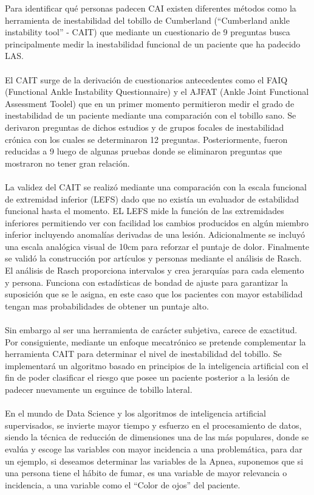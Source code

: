 Para identificar qué personas padecen CAI existen diferentes métodos como la herramienta de inestabilidad del tobillo de Cumberland (“Cumberland ankle instability tool” - CAIT) que mediante un cuestionario de 9 preguntas busca principalmente medir la inestabilidad funcional de un paciente que ha padecido LAS.
\\ \\
El CAIT surge de la derivación de cuestionarios antecedentes como el FAIQ (Functional Ankle Instability Questionnaire) y el AJFAT (Ankle Joint Functional Assessment Toolel) que en un primer momento permitieron medir el grado de inestabilidad de un paciente mediante una comparación con el tobillo sano. Se derivaron preguntas de dichos estudios y de grupos focales de inestabilidad crónica con los cuales se determinaron 12 preguntas. Posteriormente, fueron reducidas a 9 luego de algunas pruebas donde se eliminaron preguntas que mostraron no tener gran relación.
\\  \\
La validez del CAIT se realizó mediante una comparación con la escala funcional de extremidad inferior (LEFS) dado que no existía un evaluador de estabilidad funcional hasta el momento. EL LEFS mide la función de las extremidades inferiores permitiendo ver con facilidad los cambios producidos en algún miembro inferior incluyendo anomalías derivadas de una lesión. Adicionalmente se incluyó una escala analógica visual de 10cm para reforzar el puntaje de dolor. Finalmente se validó la construcción por artículos y personas mediante el análisis de Rasch. El análisis de Rasch proporciona intervalos y crea jerarquías para cada elemento y persona. Funciona con estadísticas de bondad de ajuste para garantizar la suposición que se le asigna, en este caso que los pacientes con mayor estabilidad tengan mas probabilidades de obtener un puntaje alto.
\\ \\
Sin embargo al ser una herramienta de carácter subjetiva, carece de exactitud. Por consiguiente, mediante un enfoque mecatrónico se pretende complementar la herramienta CAIT para determinar el nivel de inestabilidad del tobillo. Se implementará un algoritmo basado en principios de la inteligencia artificial con el fin de poder clasificar el riesgo que posee un paciente posterior a la lesión de padecer nuevamente un esguince de tobillo lateral.
\\ \\
En el mundo de Data Science y los algoritmos de inteligencia artificial supervisados, se invierte mayor tiempo y esfuerzo en el procesamiento de datos, siendo la técnica de reducción de dimensiones una de las más populares, donde se evalúa y escoge las variables con mayor incidencia a una problemática, para dar un ejemplo, si deseamos determinar las variables de la Apnea, suponemos que si una persona tiene el hábito de fumar, es una variable de mayor relevancia o incidencia, a una variable como el “Color de ojos” del paciente.\\ \\
